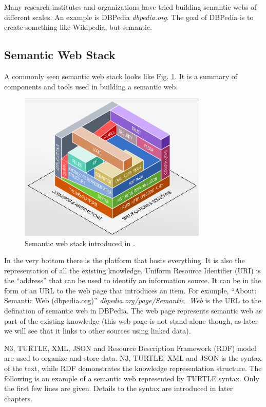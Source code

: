 Many research institutes and organizations have tried building semantic webs of different scales. An example is DBPedia \textit{dbpedia.org}. The goal of DBPedia is to create something like Wikipedia, but semantic.

\subsection{Semantic Web Stack} \label{subsec:semanticwebstack}

A commonly seen semantic web stack looks like Fig. \ref{fig:semanticwebstack}. It is a summary of components and tools used in building a semantic web.

\begin{figure}[htbp]
	\centering
	\includegraphics[width=0.8\textwidth]{./chapters/ch-semanticwebbasics/figures/semanticwebstack.png}
	\caption{Semantic web stack introduced in \cite{semanticwebstack}.}
	\label{fig:semanticwebstack}
\end{figure}

In the very bottom there is the platform that hosts everything. It is also the representation of all the existing knowledge. Uniform Resource Identifier (URI) is the “address” that can be used to identify an information source. It can be in the form of an URL to the web page that introduces an item. For example, ``About: Semantic Web (dbpedia.org)'' \textit{dbpedia.org/page/Semantic_Web} is the URL to the defination of semantic web in DBPedia. The web page represents semantic web as part of the existing knowledge (this web page is not stand alone though, as later we will see that it links to other sources using linked data).

N3, TURTLE, XML, JSON and Resource Description Framework (RDF) model are used to organize and store data. N3, TURTLE, XML and JSON is the syntax of the text, while RDF demonstrates the knowledge representation structure. The following is an example of a semantic web represented by TURTLE syntax. Only the first few lines are given. Details to the syntax are introduced in later chapters.

